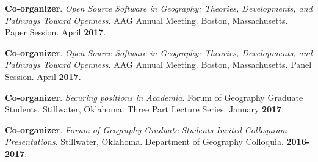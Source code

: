 \begin{cventries}
  \cventry
    {}
    {}
    {}
    {}
    {
       \begin{cvitems}
          \vspace{-3mm}
          \item {\textbf{Co-organizer}. \textit{Open Source Software in
                Geography: Theories, Developments, and Pathways Toward Openness}.
              AAG Annual Meeting. Boston, Massachusetts. Paper Session. April
              \textbf{2017}.} 
          \end{cvitems}
          }

  \cventry
    {}
    {}
    {}
    {}
    {
       \begin{cvitems}
          \vspace{-3mm}
          \item {\textbf{Co-organizer}. \textit{Open Source Software in
                Geography: Theories, Developments, and Pathways Toward Openness}.
              AAG Annual Meeting. Boston, Massachusetts. Panel Session. April
              \textbf{2017}.} 
          \end{cvitems}
          }

  \cventry
    {}
    {}
    {}
    {}
    {
       \begin{cvitems}
          \vspace{-3mm}
          \item {\textbf{Co-organizer}. \textit{Securing positions in Academia}.
              Forum of Geography Graduate Students. Stillwater, Oklahoma. Three Part Lecture
              Series. January \textbf{2017}.} 
          \end{cvitems}
          }

  \cventry
    {}
    {}
    {}
    {}
    {
       \begin{cvitems}
          \vspace{-3mm}
        \item {\textbf{Co-organizer}. \textit{Forum of Geography Graduate Students Invited
              Colloquium Presentations}. Stillwater, Oklahoma. Department of Geography Colloquia.
            \textbf{2016-2017}.}
          \end{cvitems}
          }

\end{cventries}